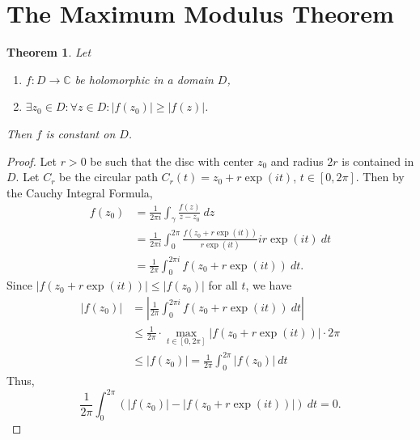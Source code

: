 \documentclass[12pt,openany]{book}
\newtheorem{theorem}{Theorem}[chapter]
\theoremstyle{definition}
\newcommand{\C}{\mathbb{C}}
\newcommand{\of}[1]{\left( #1 \right)}
\newcommand{\abs}[1]{\left\lvert #1 \right\rvert}
\begin{document}
	\section{The Maximum Modulus Theorem}
	
	\begin{tcolorbox}[colback=white,colframe=thmcolor,arc=5pt,title={\color{white}\bf Maximum Modulus Theorem}]
		\begin{theorem}
			Let \begin{enumerate}[(1)]
				\item $f:D\to\C$ be holomorphic in a domain $D$,
				\item $\exists z_0\in D:\forall z\in D:\abs{f(z_0)}\geq\abs{f(z)}$.
			\end{enumerate} Then $f$ is constant on $D$.
		\end{theorem}
	\end{tcolorbox}
	\begin{proof}
		Let $r>0$ be such that the disc with center $z_0$ and radius $2r$ is contained in $D$. Let $C_r$ be the circular path $C_r(t)=z_0+r\exp(it)$, $t\in[0,2\pi]$. Then by the Cauchy Integral Formula, \begin{align*}
		f(z_0)&=\frac{1}{2\pi i}\int_\gamma\frac{f(z)}{z-z_0}\ dz\\
		&=\frac{1}{2\pi i}\int_0^{2\pi}\frac{f(z_0+r\exp(it))}{r\exp(it)}ir\exp(it)\ dt\\
		&=\frac{1}{2\pi}\int_0^{2\pi i}f(z_0+r\exp(it))\ dt.
		\end{align*} Since $\abs{f(z_0+r\exp(it))}\leq\abs{f(z_0)}$ for all $t$, we have \begin{align*}
		\abs{f(z_0)}&=\abs{\frac{1}{2\pi}\int_0^{2\pi i}f(z_0+r\exp(it))\ dt}\\
		&\leq\frac{1}{2\pi}\cdot\max_{t\in[0,2\pi]}\abs{f(z_0+r\exp(it))}\cdot 2\pi\\
		&\leq\abs{f(z_0)}=\frac{1}{2\pi}\int_0^{2\pi}\abs{f(z_0)}\ dt
		\end{align*} Thus, \[
		\frac{1}{2\pi}\int_0^{2\pi}\of{\abs{f(z_0)}-\abs{f(z_0+r\exp(it))}}\ dt =0.
		\]
	\end{proof}
	\vspace{8pt}
\end{document}
